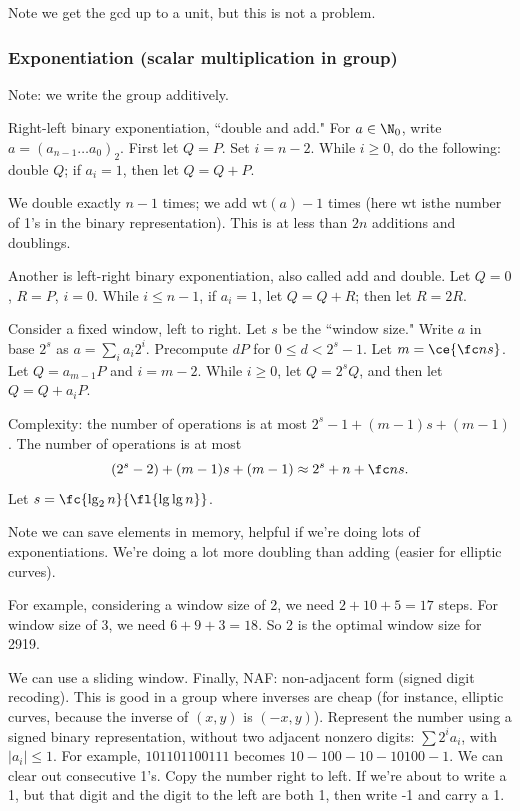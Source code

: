 Note we get the gcd up to a unit, but this is not a problem.

\subsubsection{Exponentiation (scalar multiplication in group)}
Note: we write the group additively.

Right-left binary exponentiation, ``double and add." For $a\in \N_0$, write $a=(a_{n-1}\ldots a_0)_2$. First let $Q=P$. Set $i=n-2$. While $i\ge 0$, do the following: double $Q$; if $a_i=1$, then let $Q=Q+P$.

We double exactly $n-1$ times; we add $\text{wt}(a)-1$ times (here $\text{wt}$ isthe number of 1's in the binary representation). This is at less than $2n$ additions and doublings. %

Another is left-right binary exponentiation, also called add and double. Let $Q=0$, $R=P$, $i=0$. While $i\le n-1$, if $a_i=1$, let $Q=Q+R$; then let $R=2R$.

Consider a fixed window, left to right. Let $s$ be the ``window size." Write $a$ in base $2^s$ as $a=\sum_i a_i2^{i}$. Precompute $dP$ for $0\le d<2^s-1$. Let $m=\ce{\fc ns}$. Let $Q=a_{m-1}P$ and $i=m-2$. While $i\ge 0$, let $Q=2^sQ$, and then let $Q=Q+a_iP$.

Complexity: the number of operations is at most $2^s-1 + (m-1)s + (m-1)$. The number of operations is at most
\[
(2^s-2)+(m-1)s+(m-1)\approx2^s+n+\fc ns.
\]
Let $s=\fc{\lg_2 n}{\fl{\lg\lg n}}$.

Note we can save elements in memory, helpful if we're doing lots of exponentiations. We're doing a lot more doubling than adding (easier for elliptic curves).

For example, considering a window size of 2, we need  $2+10+5=17$ steps. For window size of 3, we need $6+9+3=18$. So 2 is the optimal window size for 2919.

We can use a sliding window. Finally, NAF: non-adjacent form (signed digit recoding). This is good in a group where inverses are cheap (for instance, elliptic curves, because the inverse of $(x,y)$ is $(-x,y)$). Represent the number using a signed binary representation, without two adjacent nonzero digits: $\sum 2^ia_i$, with $|a_i|\le 1$. For example, $101101100111$ becomes $10-100-10-10100-1$. We can clear out consecutive 1's. Copy the number right to left. If we're about to write a 1, but that digit and the digit to the left are both 1, then write -1 and carry a 1.

